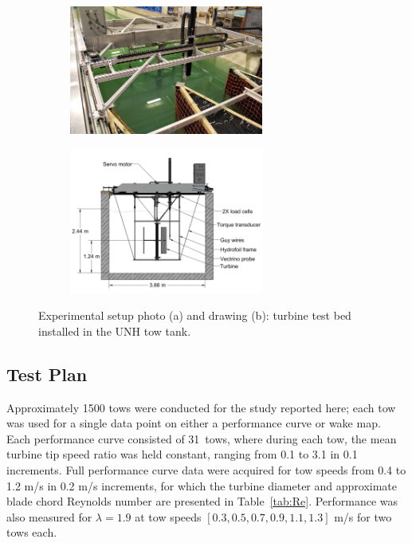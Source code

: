 \documentclass[energies,article,accept,moreauthors,pdftex,10pt,a4paper]{mdpi}
\theoremstyle{mdpi}
\newcounter{ex}
\newcounter{re}
\begin{document}
\begin{figure}[H]
    \centering
    \begin{subfigure}[t]{\textwidth}
        \centering
        \includegraphics[width=0.7\textwidth]{figures/exp-setup-photo}
        \caption{}
        \label{fig:exp-setup-photo}
    \end{subfigure}

    \begin{subfigure}[t]{\textwidth}
        \centering
        \includegraphics[width=0.7\textwidth]{figures/exp_setup_drawing}
        \caption{}
        \label{fig:exp-setup-dwg}
    \end{subfigure}
    
    \caption{Experimental setup photo (a) and drawing (b): turbine test bed
        installed in the UNH tow tank.}
 
    \label{fig:exp-setup}
\end{figure}


\subsection{Test Plan}

Approximately 1500 tows were conducted for the study reported here; each tow was
used for a single data point on either a performance curve or wake map. Each
performance curve consisted of 31~tows, where during each tow, the mean turbine
tip speed ratio was held constant, ranging from 0.1 to 3.1 in 0.1 increments.
Full performance curve data were acquired for tow speeds from 0.4 to 1.2 m/s in
0.2 m/s increments, for which the turbine diameter and approximate blade chord
Reynolds number are presented in Table~\ref{tab:Re}. Performance was also
measured for $\lambda=1.9$ at tow speeds $[0.3, 0.5, 0.7, 0.9, 1.1, 1.3]$ m/s
for two tows each.
\end{document}
